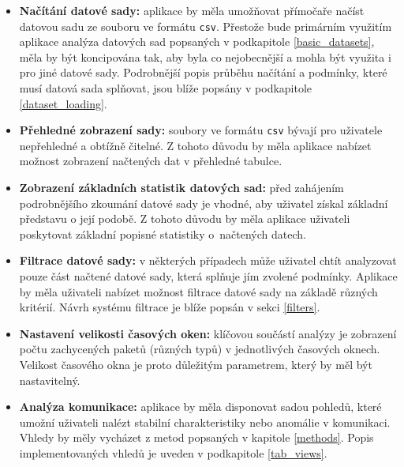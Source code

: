 \begin{itemize}

    \item \textbf{Načítání datové sady:} aplikace by měla umožňovat přímočaře načíst datovou sadu ze souboru ve formátu \texttt{csv}. Přestože bude primárním využitím aplikace analýza datových sad popsaných v podkapitole \ref{basic_datasets}, měla by být koncipována tak, aby byla co nejobecnější a mohla být využita i pro jiné datové sady. Podrobnější popis průběhu načítání a podmínky, které musí datová sada splňovat, jsou blíže popsány v podkapitole \ref{dataset_loading}. 
    
    \item \textbf{Přehledné zobrazení sady:} soubory ve formátu \texttt{csv} bývají pro uživatele nepřehledné a obtížně čitelné. Z tohoto důvodu by měla aplikace nabízet možnost zobrazení načtených dat v přehledné tabulce.
    
    \item \textbf{Zobrazení základních statistik datových sad:} před zahájením podrobnějšího zkoumání datové sady je vhodné, aby uživatel získal základní představu o její podobě. Z tohoto důvodu by měla aplikace uživateli poskytovat základní popisné statistiky o~načtených datech.
    
    \item \textbf{Filtrace datové sady:} v některých případech může uživatel chtít analyzovat pouze část načtené datové sady, která splňuje jím zvolené podmínky. Aplikace by měla uživateli nabízet možnost filtrace datové sady na základě různých kritérií. Návrh systému filtrace je blíže popsán v sekci \ref{filters}.
    
    \item \textbf{Nastavení velikosti časových oken:} klíčovou součástí analýzy je zobrazení počtu zachycených paketů (různých typů) v jednotlivých časových oknech. Velikost časového okna je proto důležitým parametrem, který by měl být nastavitelný.
    
    \item \textbf{Analýza komunikace:} aplikace by měla disponovat sadou pohledů, které umožní uživateli nalézt stabilní charakteristiky nebo anomálie v komunikaci. Vhledy by měly vycházet z metod popsaných v kapitole \ref{methods}. Popis implementovaných vhledů je uveden v podkapitole \ref{tab_views}.
    
    
\end{itemize}

